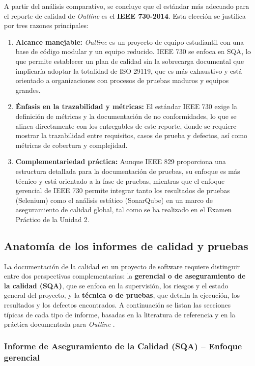 \documentclass[12pt, letterpaper]{article}
\begin{document}
A partir del análisis comparativo, se concluye que el estándar más adecuado para el reporte de calidad de \textit{Outline} es el \textbf{IEEE 730-2014}. Esta elección se justifica por tres razones principales:

\begin{enumerate}
    \item \textbf{Alcance manejable:} \textit{Outline} es un proyecto de equipo estudiantil con una base de código modular y un equipo reducido. IEEE 730 se enfoca en SQA, lo que permite establecer un plan de calidad sin la sobrecarga documental que implicaría adoptar la totalidad de ISO 29119, que es más exhaustivo y está orientado a organizaciones con procesos de pruebas maduros y equipos grandes.
    \item \textbf{Énfasis en la trazabilidad y métricas:} El estándar IEEE 730 exige la definición de métricas y la documentación de no conformidades, lo que se alinea directamente con los entregables de este reporte, donde se requiere mostrar la trazabilidad entre requisitos, casos de prueba y defectos, así como métricas de cobertura y complejidad.
    \item \textbf{Complementariedad práctica:} Aunque IEEE 829 proporciona una estructura detallada para la documentación de pruebas, su enfoque es más técnico y está orientado a la fase de pruebas, mientras que el enfoque gerencial de IEEE 730 permite integrar tanto los resultados de pruebas (Selenium) como el análisis estático (SonarQube) en un marco de aseguramiento de calidad global, tal como se ha realizado en el Examen Práctico de la Unidad 2.
\end{enumerate}

\subsection{Anatomía de los informes de calidad y pruebas}

La documentación de la calidad en un proyecto de software requiere distinguir entre dos perspectivas complementarias: la \textbf{gerencial o de aseguramiento de la calidad (SQA)}, que se enfoca en la supervisión, los riesgos y el estado general del proyecto, y la \textbf{técnica o de pruebas}, que detalla la ejecución, los resultados y los defectos encontrados. A continuación se listan las secciones típicas de cada tipo de informe, basadas en la literatura de referencia y en la práctica documentada para \textit{Outline} \parencite{ieee730, galin2018}.

\subsubsection*{Informe de Aseguramiento de la Calidad (SQA) – Enfoque gerencial}
\end{document}
